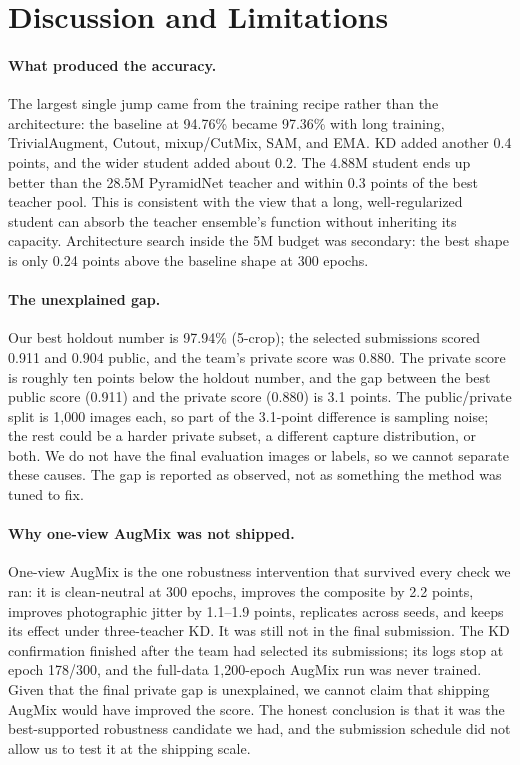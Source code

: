 \section{Discussion and Limitations}
\label{sec:discussion}

\paragraph{What produced the accuracy.}
The largest single jump came from the training recipe rather than the
architecture: the baseline at 94.76\% became 97.36\% with long training,
TrivialAugment, Cutout, mixup/CutMix, SAM, and EMA. KD added another 0.4 points,
and the wider student added about 0.2. The 4.88M student ends up better than the
28.5M PyramidNet teacher and within 0.3 points of the best teacher pool. This is
consistent with the view that a long, well-regularized student can absorb the
teacher ensemble's function without inheriting its capacity. Architecture search
inside the 5M budget was secondary: the best shape is only 0.24 points above the
baseline shape at 300 epochs.

\paragraph{The unexplained gap.}
Our best holdout number is 97.94\% (5-crop); the selected submissions scored
0.911 and 0.904 public, and the team's private score was 0.880. The private score
is roughly ten points below the holdout number, and the gap between the best
public score (0.911) and the private score (0.880) is 3.1 points. The
public/private split is 1,000 images each, so part of the 3.1-point difference is
sampling noise; the rest could be a harder private subset, a different capture
distribution, or both. We do not have the final evaluation images or labels, so
we cannot separate these causes. The gap is reported as observed, not as
something the method was tuned to fix.

\paragraph{Why one-view AugMix was not shipped.}
One-view AugMix is the one robustness intervention that survived every check we
ran: it is clean-neutral at 300 epochs, improves the composite by 2.2 points,
improves photographic jitter by 1.1--1.9 points, replicates across seeds, and
keeps its effect under three-teacher KD. It was still not in the final submission.
The KD confirmation finished after the team had selected its submissions; its logs
stop at epoch 178/300, and the full-data 1,200-epoch AugMix run was never trained.
Given that the final private gap is unexplained, we cannot claim that shipping
AugMix would have improved the score. The honest conclusion is that it was the
best-supported robustness candidate we had, and the submission schedule did not
allow us to test it at the shipping scale.

